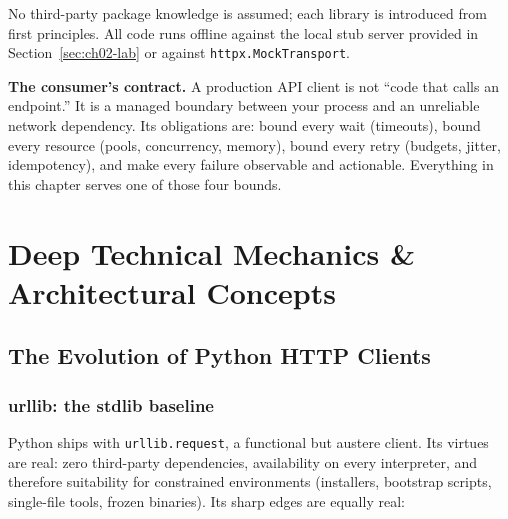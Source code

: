 No third-party package knowledge is assumed; each library is introduced from
first principles. All code runs offline against the local stub server provided
in Section~\ref{sec:ch02-lab} or against \texttt{httpx.MockTransport}.

\begin{keyconceptbox}
\textbf{The consumer's contract.} A production API client is not ``code that
calls an endpoint.'' It is a managed boundary between your process and an
unreliable network dependency. Its obligations are: bound every wait
(timeouts), bound every resource (pools, concurrency, memory), bound every
retry (budgets, jitter, idempotency), and make every failure observable and
actionable. Everything in this chapter serves one of those four bounds.
\end{keyconceptbox}


\section{Deep Technical Mechanics \& Architectural Concepts}

\subsection{The Evolution of Python HTTP Clients}
\label{sec:ch02-evolution}

\subsubsection{urllib: the stdlib baseline}

Python ships with \texttt{urllib.request}, a functional but austere client.
Its virtues are real: zero third-party dependencies, availability on every
interpreter, and therefore suitability for constrained environments
(installers, bootstrap scripts, single-file tools, frozen binaries). Its sharp
edges are equally real:

